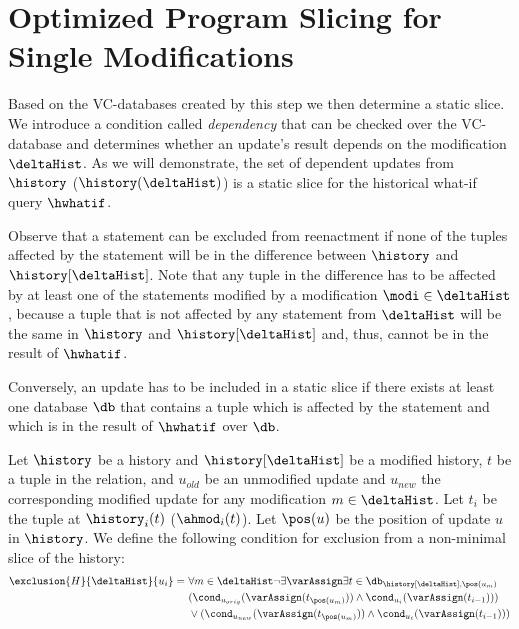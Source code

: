\section{Optimized Program Slicing for Single Modifications}
\label{sec:optim-progr-slic}

Based on the VC-databases created by this step we then determine a static slice. We introduce a condition called \textit{dependency} that can be checked over the VC-database and determines whether an update's result depends on the modification $\deltaHist$. As we will demonstrate, the set of dependent updates from $\history$ ($\history(\deltaHist)$) is a static slice for the historical what-if query $\hwhatif$.

Observe that a statement can be excluded from reenactment if none of the tuples affected by the statement will be in the difference between $\history$ and $\history[\deltaHist]$. Note that any tuple in the difference has to be affected by at least one of the statements modified by a modification $\modi \in \deltaHist$, because a tuple that is not affected by any statement from $\deltaHist$ will be the same in $\history$ and $\history[\deltaHist]$ and, thus, cannot be in the result of $\hwhatif$.

Conversely, an update has to be included in a static slice if there exists at least one database $\db$ that contains a tuple which is affected by the statement and which is in the result of $\hwhatif$ over $\db$.


\begin{defi}
Let $\history$ be a history and $\history[\deltaHist]$ be a modified history, $t$ be a tuple in the relation, and $u_{old}$ be an unmodified update and $u_{new}$ the corresponding modified update for any modification $m \in \deltaHist$. Let $t_i$ be the tuple at $\history_i(t)$ ($\ahmod_i(t)$). Let $\pos(u)$ be the position of update $u$ in $\history$. We define the following condition for exclusion from a non-minimal slice of the history:
\begin{align*}
\exclusion{H}{\deltaHist}{u_i} =\ &\forall m \in \deltaHist \neg\exists \varAssign \exists t \in \db_{\history[\deltaHist], \pos(u_m)}\\
&(\cond_{u_{orig}}(\varAssign(t_{\pos({u_{m}})})) \land \cond_{u_{i}}(\varAssign(t_{i-1})))\\
&\lor (\cond_{u_{new}}(\varAssign(t_{\pos({u_{m}})})) \land \cond_{u_{i}}(\varAssign(t_{i-1})))
\end{align*}
\end{defi}

